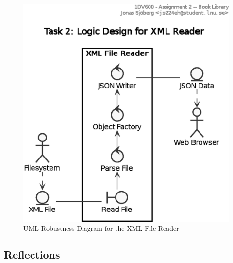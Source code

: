 \begin{figure}[htbp]
  \centering
  \includegraphics[width=\linewidth]{include/uml-xml-design-rob.eps}
  \caption{UML Robustness Diagram for the XML File Reader}
  \label{fig:uml-xmlrob}
\end{figure}

%
%       
%       
%       



\subsection{Reflections}\label{task-2-reflect}
%

